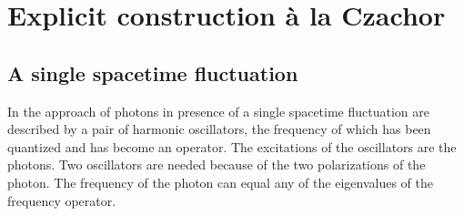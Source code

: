 \documentclass[12pt,a4paper]{article}
\begin{document}
\section{Explicit construction \`a la Czachor}



\subsection{A single spacetime fluctuation}

In the approach of \cite {CM00,CS01,CM02} photons in presence of
a single spacetime fluctuation are described by a pair of
harmonic oscillators, the frequency of which 
has been quantized and has become an operator. The excitations
of the oscillators are the photons. Two oscillators
are needed because of the two polarizations of the photon.
The frequency of the photon can equal any of the
eigenvalues of the frequency operator.
\end{document}
